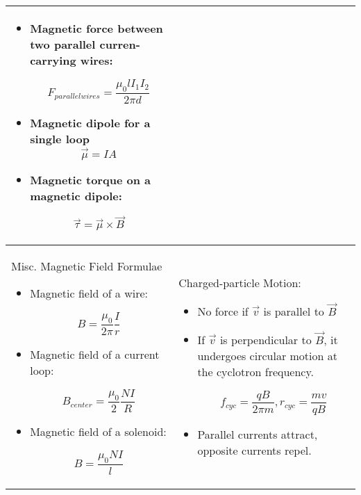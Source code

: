 \documentclass{article}
\begin{document}
\begin{center}
\begin{longtable}{|p{9cm}|p{9cm}|}
\begin{itemize}
			\item Magnetic force between two parallel curren-carrying wires:

			      \[ F_{parallel wires} = \frac{\mu_0 l I_1 I_2}{2 \pi d}\]

			\item Magnetic dipole for a single loop \[\vec{\mu} = IA\]

			\item Magnetic torque on a magnetic dipole:

			      \[ \vec{\tau} = \vec{\mu} \times \vec{B}\]

		\end{itemize}                       \\

		\hline



		Misc. Magnetic Field Formulae

		\begin{itemize}

			\item Magnetic field of a wire:

			      \[B = \frac{ \mu_0 }{2\pi} \frac{I}{r}\]

			\item Magnetic field of a current loop:

			      \[B_{center} = \frac{ \mu_0 }{2}\frac{NI}{R}\]

			\item Magnetic field of a solenoid:

			      \[B = \frac{ \mu_0 NI}{l}\]

		\end{itemize}



		                &



		Charged-particle Motion:

		\begin{itemize}

			\item No force if $\vec{v}$ is parallel to $\vec{B}$

			\item If $\vec{v}$ is perpendicular to $\vec{B}$, it undergoes circular motion at the cyclotron frequency.

			      \[ f_{cyc} = \frac{qB}{2\pi m}, r_{cyc} = \frac{mv}{qB}\]

			\item Parallel currents attract, opposite currents repel.


\end{itemize}
\end{longtable}
\end{center}
\end{document}
